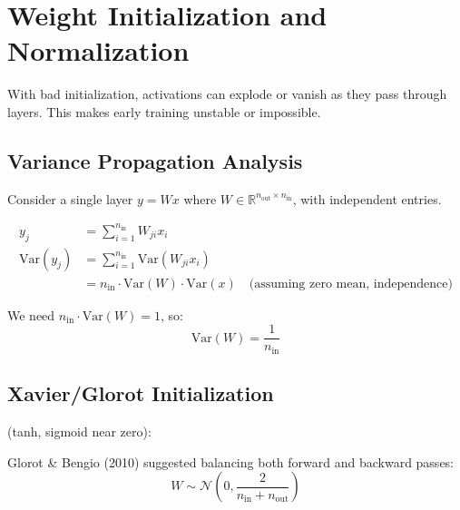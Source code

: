 \newpage
\section{Weight Initialization and Normalization}

 With bad initialization, activations can explode or vanish as they pass through layers. This makes early training unstable or impossible.


\subsection{Variance Propagation Analysis}

Consider a single layer $y = Wx$ where $W \in \mathbb{R}^{n_{\text{out}} \times n_{\text{in}}}$, with independent entries.

\begin{align}
    y_j &= \sum_{i=1}^{n_{\text{in}}} W_{ji} x_i \\
    \text{Var}(y_j) &= \sum_{i=1}^{n_{\text{in}}} \text{Var}(W_{ji} x_i) \\
    &= n_{\text{in}} \cdot \text{Var}(W) \cdot \text{Var}(x) \quad \text{(assuming zero mean, independence)}
\end{align}


 We need $n_{\text{in}} \cdot \text{Var}(W) = 1$, so:
\begin{equation}
    \text{Var}(W) = \frac{1}{n_{\text{in}}}
\end{equation}


\subsection{Xavier/Glorot Initialization}

 (tanh, sigmoid near zero):

Glorot \& Bengio (2010) suggested balancing both forward and backward passes:
\begin{equation}
    W \sim \mathcal{N}\left(0, \frac{2}{n_{\text{in}} + n_{\text{out}}}\right)
\end{equation}

